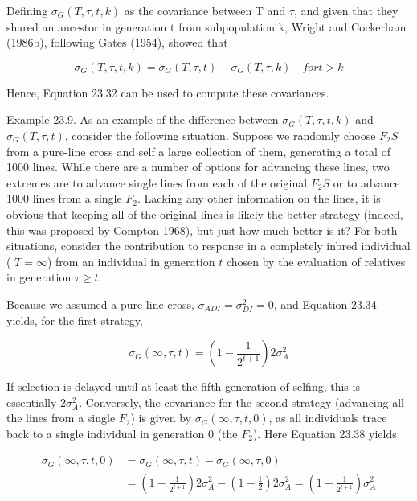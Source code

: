 \documentclass{article}
\begin{document}
Defining  $ \sigma_{G}(T,\tau,t,k) $ as the covariance between T and  $ \tau $, and given that they shared an ancestor in generation t from subpopulation k, Wright and Cockerham (1986b), following Gates (1954), showed that

\begin{equation}
\sigma_{G}(T,\tau,t,k)=\sigma_{G}(T,\tau,t)-\sigma_{G}(T,\tau,k)\quad for t>k
\tag{23.38}
\label{eq:23_38}
\end{equation}

Hence, Equation 23.32 can be used to compute these covariances.

Example 23.9. As an example of the difference between  $ \sigma_G(T, \tau, t, k) $ and  $ \sigma_G(T, \tau, t) $, consider the following situation. Suppose we randomly choose  $ F_2S $ from a pure-line cross and self a large collection of them, generating a total of 1000 lines. While there are a number of options for advancing these lines, two extremes are to advance single lines from each of the original  $ F_2S $ or to advance 1000 lines from a single  $ F_2 $. Lacking any other information on the lines, it is obvious that keeping all of the original lines is likely the better strategy (indeed, this was proposed by Compton 1968), but just how much better is it? For both situations, consider the contribution to response in a completely inbred individual ( $ T = \infty $) from an individual in generation  $ t $ chosen by the evaluation of relatives in generation  $ \tau \geq t $.

Because we assumed a pure-line cross,  $ \sigma_{ADI} = \sigma_{DI}^2 = 0 $, and Equation 23.34 yields, for the first strategy,

\begin{equation}
\sigma_{G}(\infty,\tau,t)=\left(1-\frac{1}{2^{t+1}}\right)2\sigma_{A}^{2}
\end{equation}

If selection is delayed until at least the fifth generation of selfing, this is essentially  $ 2\sigma_A^2 $. Conversely, the covariance for the second strategy (advancing all the lines from a single  $ F_2 $) is given by  $ \sigma_G(\infty, \tau, t, 0) $, as all individuals trace back to a single individual in generation 0 (the  $ F_2 $). Here Equation 23.38 yields

\begin{equation}
\begin{aligned}\sigma_{G}(\infty,\tau,t,0)&=\sigma_{G}(\infty,\tau,t)-\sigma_{G}(\infty,\tau,0)\\&=\left(1-\frac{1}{2^{t+1}}\right)2\sigma_{A}^{2}-\left(1-\frac{1}{2}\right)2\sigma_{A}^{2}=\left(1-\frac{1}{2^{t+1}}\right)\sigma_{A}^{2}\end{aligned}
\end{equation}
\end{document}
